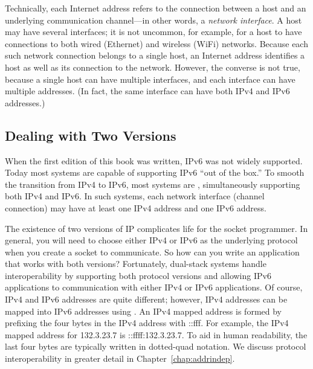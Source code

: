 Technically, each Internet address refers to the connection between a
host and an underlying communication channel---in other words, a
\emph{network interface}.  A host may have several interfaces; it is
not uncommon, for example, for a host to have connections to both
wired (Ethernet) and wireless (WiFi) networks.
Because each such network connection belongs to a
single host, an Internet address identifies a host as well as its
connection to the network.  However, the converse is not true, because
a single host can have multiple interfaces, and each interface can
have multiple addresses.  (In fact, the same interface can have both IPv4
and IPv6 addresses.)

\subsection{Dealing with Two Versions}

When the first edition of this book was written, IPv6 was not widely
supported.  Today most systems are capable of supporting IPv6 ``out of the box.''
To smooth the transition from IPv4 to IPv6, most systems are ,
simultaneously supporting both IPv4 and IPv6.  In such systems, each
network interface (channel connection) may have at least one IPv4 address
and one IPv6 address.  

The existence of two versions of IP complicates life for the socket
programmer.  In general, you will need to choose either
IPv4 or IPv6 as the underlying protocol when you create a socket to
communicate.  So how can you write an application that works with both versions?
Fortunately, dual-stack systems handle interoperability by supporting both
protocol versions and allowing IPv6 applications
to communication with either IPv4 or IPv6 applications.  Of course, IPv4 and IPv6 addresses
are quite different; however, IPv4 addresses can be mapped into IPv6 addresses using
.  An IPv4 mapped
address is formed by prefixing the four bytes in the IPv4 address with ::fff.  For
example, the IPv4 mapped address for 132.3.23.7 is ::ffff:132.3.23.7.  To aid
in human readability, the last four
bytes are typically written in dotted-quad notation.  We discuss protocol interoperability
in greater detail in Chapter~\ref{chap:addrindep}.


